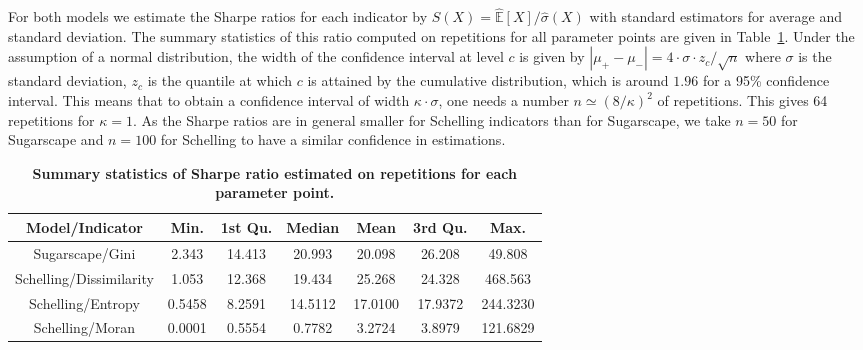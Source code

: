 \documentclass{JASSS}
\begin{document}
\label{app:convergence}







For both models we estimate the Sharpe ratios for each indicator by $S(X) = \hat{\mathbb{E}}\left[X\right]/\hat{\sigma}(X)$ with standard estimators for average and standard deviation. The summary statistics of this ratio computed on repetitions for all parameter points are given in Table~\ref{tab:summarysharpes}. Under the assumption of a normal distribution, the width of the confidence interval at level $c$ is given by $\left|\mu_+ - \mu_-\right| = 4\cdot \sigma \cdot z_{c} / \sqrt{n}$ where $\sigma$ is the standard deviation, $z_{c}$ is the quantile at which $c$ is attained by the cumulative distribution, which is around $1.96$ for a 95\% confidence interval. This means that to obtain a confidence interval of width $\kappa \cdot \sigma$, one needs a number $n \simeq (8 / \kappa )^2$ of repetitions. This gives 64 repetitions for $\kappa = 1$. As the Sharpe ratios are in general smaller for Schelling indicators than for Sugarscape, we take $n = 50$ for Sugarscape and $n = 100$ for Schelling to have a similar confidence in estimations.


\begin{table}[!t]
\centering
	\begin{tabular}{|c|cccccc|}
	\hline
Model/Indicator & Min. & 1st Qu. &  Median &  Mean & 3rd Qu. & Max. \\\hline
Sugarscape/Gini & 2.343 & 14.413 & 20.993 & 20.098 & 26.208 & 49.808\\\hline 
Schelling/Dissimilarity & 1.053 & 12.368 & 19.434 & 25.268 & 24.328 & 468.563\\
Schelling/Entropy & 0.5458 & 8.2591 & 14.5112 & 17.0100 & 17.9372 & 244.3230\\
Schelling/Moran & 0.0001 & 0.5554 & 0.7782 & 3.2724 & 3.8979 & 121.6829\\\hline
    \end{tabular}
    \caption{\textbf{Summary statistics of Sharpe ratio estimated on repetitions for each parameter point.}}
\label{tab:summarysharpes}
\end{table}
\end{document}
